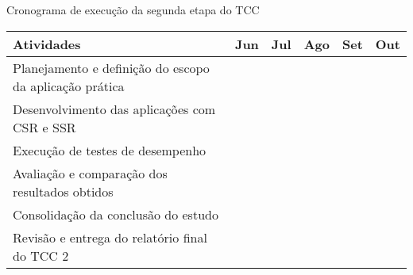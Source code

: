 \begin{quadro}[H]
    \centering
    \caption{Cronograma de execução da segunda etapa do TCC}
    \label{tab:cronograma_etapa2}
    \renewcommand{\arraystretch}{1.5}
    \begin{tabular}{|>{\centering\arraybackslash}p{3.5cm}|>{\centering\arraybackslash}p{1.25cm}|>{\centering\arraybackslash}p{1.25cm}|>{\centering\arraybackslash}p{1.25cm}|>{\centering\arraybackslash}p{1.25cm}|>{\centering\arraybackslash}p{1.25cm}|}
        \hline
        \textbf{Atividades} & \textbf{Jun} & \textbf{Jul} & \textbf{Ago} & \textbf{Set} & \textbf{Out} \\
        \hline
        Planejamento e definição do escopo da aplicação prática & \cellcolor{softCyan1} & & & & \\
        \hline
        Desenvolvimento das aplicações com CSR e SSR & & \cellcolor{softCyan2} & \cellcolor{softCyan2} & & \\
        \hline
        Execução de testes de desempenho & & & \cellcolor{emeraldSea} & \cellcolor{emeraldSea} & \\
        \hline
        Avaliação e comparação dos resultados obtidos & & & & \cellcolor{deepTeal} & \\
        \hline
        Consolidação da conclusão do estudo & & & & \cellcolor{darkEmerald} & \cellcolor{darkEmerald} \\
        \hline
        Revisão e entrega do relatório final do TCC 2 & & & & & \cellcolor{vividTurquoise} \\
        \hline
    \end{tabular}
\end{quadro}



